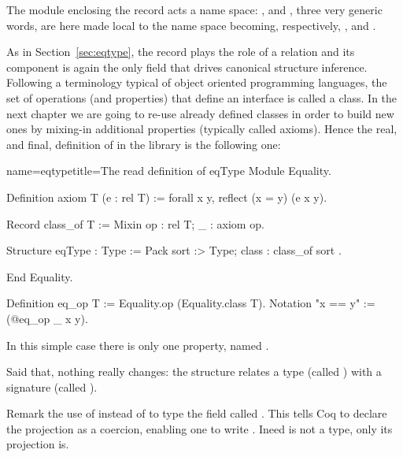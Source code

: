 
The  module enclosing the record acts a name space: ,
 and , three very generic words, are here
made local to the  name space becoming, respectively,
,  and .

As in Section~\ref{sec:eqtype}, the record plays the role of
a relation and its  component is again the only field
that drives canonical structure inference. Following
a terminology typical of object oriented programming languages,
the set of operations (and properties) that define an interface is
called a class.  In the next chapter we are going to re-use already
defined classes in order to build new ones by mixing-in additional
properties (typically called axioms).
Hence the real, and final, definition of  in the
\mcbMC{} library is the following one:

\begin{coq}{name=eqtype}{title=The read definition of eqType}
Module Equality.

Definition axiom T (e : rel T) := forall x y, reflect (x = y) (e x y).

Record class_of T := Mixin {op : rel T; _ : axiom op}.

Structure eqType : Type := Pack {
  sort :> Type;
  class : class_of sort
}.

End Equality.

Definition eq_op T := Equality.op (Equality.class T).
Notation "x == y" := (@eq_op _ x y).
\end{coq}

In this simple case there is only one property, named
.

Said that, nothing really changes: the  structure 
relates a type (called ) with a signature (called ).

Remark the use of \C{:>} instead of \C{:} to type the
field called .  This tells Coq to declare the
 projection
as a coercion, enabling one to write .  Ineed  is not a type, only its  projection is.

